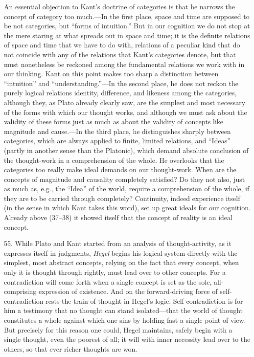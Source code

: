 \documentclass[12pt,a4paper]{book}
\newcommand{\opage}[1]{\marginnote{\footnotesize\textit{[#1]}}}
\begin{document}
An essential objection to Kant's doctrine of categories is that he narrows
the concept of category too much.---In the first place, space and time are
supposed to be not categories, but ``forms of intuition.'' But in our
cognition we do not stop at the mere staring at what spreads out in space and
time; it is the definite relations of space and time that we have to do with,
relations of a peculiar kind that do not coincide with any of the relations
that Kant's categories denote, but that must nonetheless be reckoned among
the fundamental relations we work with in our thinking. Kant on this point
makes too sharp a distinction between ``intuition'' and
``understanding.''---In the second place, he does not reckon the purely
logical relations identity, difference, and likeness among the categories,
although they, as Plato already clearly saw, are the simplest and most
necessary of the forms with which our thought works, and although we must ask
about the validity of these forms just as much as about the validity of
concepts like magnitude and cause.---In the third place, he distinguishes
sharply between categories, which are always applied to finite, limited
relations, and ``Ideas'' (partly \opage{147}in another sense than the Platonic), which
demand absolute conclusion of the thought-work in a comprehension of the
whole. He overlooks that the categories too really make ideal demands on our
thought-work. When are the concepts of magnitude and causality completely
satisfied? Do they not also, just as much as, e.g., the ``Idea'' of the
world, require a comprehension of the whole, if they are to be carried
through completely? Continuity, indeed experience itself (in the sense in
which Kant takes this word), set up great ideals for our cognition. Already
above (37--38) it showed itself that the concept of reality is an ideal
concept.

55. While Plato and Kant started from an analysis of thought-activity, as it
expresses itself in judgments, \emph{Hegel} begins his logical system
directly with the simplest, most abstract concepts, relying on the fact that
every concept, when only it is thought through rightly, must lead over to
other concepts. For a contradiction will come forth when a single concept is
set as the sole, all-comprising expression of existence. And on the
forward-driving force of self-contradiction rests the train of thought in
Hegel's logic. Self-contradiction is for him a testimony that no thought can
stand isolated---that the world of thought constitutes a whole against which
one sins by holding fast a single point of view. But precisely for this
reason one could, Hegel maintains, safely begin with a single thought, even
the poorest of all; it will with inner necessity lead over to the others, so
that ever richer thoughts are won.
\end{document}
